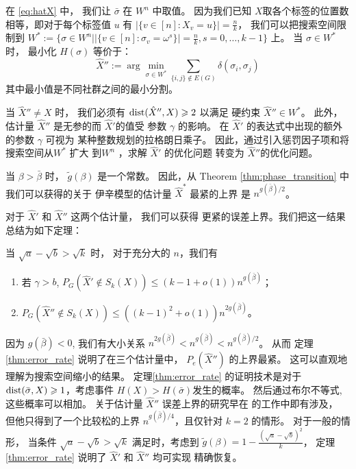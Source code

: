 在 \eqref{eq:hatX} 中， 我们让 $\bar{\sigma}$ 在 $W^n$ 中取值。
因为我们已知 $X$取各个标签的位置数相等，即对于每个标签值 $u$
有 $|\{v \in [n] : X_v = u\}| = \frac{n}{k}$，
我们可以把搜索空间限制到
$W^*:= \{\sigma\in W^n \big\vert |\{v \in [n] : \sigma_v = \omega^s\}| = \frac{n}{k}, s=0,\dots, k-1 \}$
上。
当 $\sigma \in W^*$ 时， 最小化 $H(\sigma)$ 等价于：
\begin{equation}\label{eq:hatX_double_prime}
\hat{X}'' := \arg\min_{\sigma \in W^*} \sum_{\{i,j\} \not\in E(G) } \delta(\sigma_i, \sigma_j)
\end{equation}
其中最小值是不同社群之间的最小分割。

当 $\hat{X}'' \neq X$ 时，
我们必须有  $\operatorname{dist}(\hat{X}'' ,X)\geqslant 2$
以满足 硬约束 $\hat{X}'' \in W^*$。
此外，估计量 $\hat{X}''$ 是无参的而 $\hat{X}'$的值受
参数 $\gamma$ 的影响。
在
$\hat{X}'$ 的表达式中出现的额外的参数 $\gamma$ 可视为
某种整数规划的拉格朗日乘子。
因此，通过引入惩罚因子项和将搜索空间从$W^*$ 扩大 到$W^n$
，求解 $\hat{X}'$
的优化问题 转变为 $\hat{X}''$的优化问题。

当 $\beta > \bar{\beta}$ 时，
$\tilde{g}(\beta)$ 是一个常数。
因此，从 Theorem \ref{thm:phase_transition} 中我们可以获得的关于
伊辛模型的估计量 $\hat{X}^*$ 最紧的上界
是  $n^{g(\bar{\beta})/2}$。

对于 $\hat{X}'$ 和 $\hat{X}''$ 这两个估计量，
我们可以获得 更紧的误差上界。我们把这一结果总结为如下定理：
\begin{theorem}\label{thm:error_rate}
当 $\sqrt{a} - \sqrt{b} > \sqrt{k}$ 时，
对于充分大的 $n$，我们有 
\begin{enumerate}
	\item 若 $\gamma > b$, $P_G(\hat{X}' \not\in S_k(X)) \leq (k-1+o(1))n^{g(\bar{\beta})}$；
	\item $P_G(\hat{X}'' \not\in S_k(X)) \leq ((k-1)^2+o(1))n^{2g(\bar{\beta})}$。
\end{enumerate}
\end{theorem}
因为 $g(\bar{\beta})<0$, 我们有大小关系 $n^{2g(\bar{\beta})} < n^{g(\bar{\beta})} < n^{g(\bar{\beta})/2}$。
从而 定理 \ref{thm:error_rate} 说明了在三个估计量中，
$P_e(\hat{X}'')$ 
的上界最紧。
这可以直观地理解为搜索空间缩小的结果。
定理\ref{thm:error_rate} 的证明技术是对于 $\operatorname{dist}(\bar{\sigma}, X) \geqslant 1$，考虑事件
$H(X) > H(\bar{\sigma})$发生的概率。
然后通过布尔不等式, 这些概率可以相加。
关于估计量 $\hat{X}''$ 误差上界的研究早在\citet{abbe2015exact} 的工作中即有涉及，
但他只得到了一个比较松的上界 $n^{g(\bar{\beta})/4}$，且仅针对 $k=2$ 的情形。
对于一般的情形，
当条件
$\sqrt{a} - \sqrt{b} > \sqrt{k}$ 满足时，考虑到
$\tilde{g}(\beta) = 1- \frac{(\sqrt{a} - \sqrt{b})^2}{k}$，
定理 \ref{thm:error_rate} 说明了  $\hat{X}'$ 和 $\hat{X}''$
均可实现
精确恢复。


